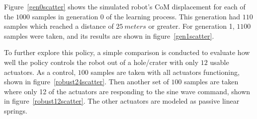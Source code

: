 Figure~\ref{gen0scatter} shows the simulated robot's CoM displacement for each of the \(1000\) samples in generation 0 of the learning process.
This generation had \(110\) samples which reached a distance of \(\SI{25}{meters}\) or greater.
For generation 1, \(1100\) samples were taken, and its results are shown in figure~\ref{gen1scatter}.

To further explore this policy, a simple comparison is conducted to evaluate how well the policy controls the robot out of a hole/crater with only \(12\) usable actuators.
As a control, \(100\) samples are taken with all actuators functioning, shown in figure~\ref{robust24scatter}.
Then another set of \(100\) samples are taken where only 12 of the actuators are responding to the sine wave command, shown in figure~\ref{robust12scatter}.
The other actuators are modeled as passive linear springs.


